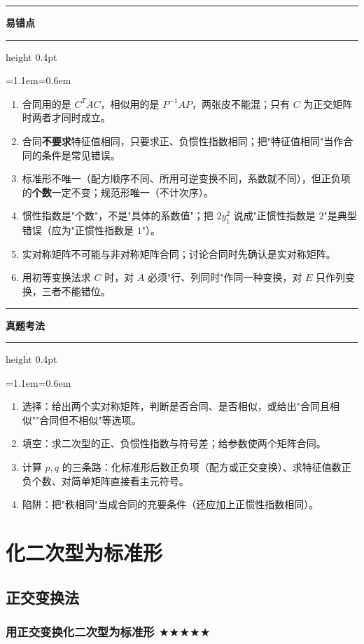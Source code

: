 \documentclass[11pt,openany,UTF8]{ctexbook}
\newcommand{\callouthead}[2]{%
  \par\addvspace{7pt}\noindent
  {\color{#1}\rule[-0.15em]{3pt}{1.05em}}\hspace{0.5em}%
  {\bfseries\color{#1}#2}\par\nobreak\vspace{-0.35em}%
  {\color{rulesep}\hrule height 0.4pt}\nobreak\vspace{0.45em}%
  \begingroup\small\setlength{\parindent}{0pt}%
  \leftskip=1.1em\rightskip=0.6em\noindent\ignorespaces}
\newcommand{\calloutend}{\par\endgroup\addvspace{7pt}}
\newenvironment{callwarn}[1]{\callouthead{warnbar}{#1}}{\calloutend}
\newenvironment{callexam}[1]{\callouthead{exambar}{#1}}{\calloutend}
\begin{document}
\begin{callwarn}{易错点}
\begin{enumerate}
\item 合同用的是 $C^TAC$，相似用的是 $P^{-1}AP$，两张皮不能混；只有 $C$ 为正交矩阵时两者才同时成立。
\item 合同\textbf{不要求}特征值相同，只要求正、负惯性指数相同；把"特征值相同"当作合同的条件是常见错误。
\item 标准形不唯一（配方顺序不同、所用可逆变换不同，系数就不同），但正负项的\textbf{个数}一定不变；规范形唯一（不计次序）。
\item 惯性指数是"个数"，不是"具体的系数值"；把 $2y_1^2$ 说成"正惯性指数是 $2$"是典型错误（应为"正惯性指数是 $1$"）。
\item 实对称矩阵不可能与非对称矩阵合同；讨论合同时先确认是实对称矩阵。
\item 用初等变换法求 $C$ 时，对 $A$ 必须"行、列同时"作同一种变换，对 $E$ 只作列变换，三者不能错位。
\end{enumerate}
\end{callwarn}

\begin{callexam}{真题考法}
\begin{enumerate}
\item 选择：给出两个实对称矩阵，判断是否合同、是否相似，或给出"合同且相似""合同但不相似"等选项。
\item 填空：求二次型的正、负惯性指数与符号差；给参数使两个矩阵合同。
\item 计算 $p,q$ 的三条路：化标准形后数正负项（配方或正交变换）、求特征值数正负个数、对简单矩阵直接看主元符号。
\item 陷阱：把"秩相同"当成合同的充要条件（还应加上正惯性指数相同）。
\end{enumerate}
\end{callexam}

\section{化二次型为标准形}

\subsection{正交变换法}

\subsubsection{用正交变换化二次型为标准形 $\bigstar$$\bigstar$$\bigstar$$\bigstar$$\bigstar$}
\end{document}
